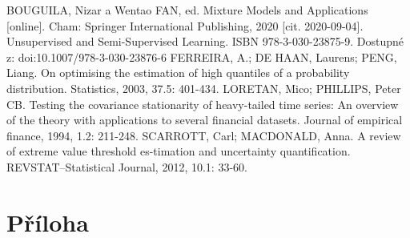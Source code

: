\documentclass[11pt,twoside,openright]{report}
\begin{document}
\begin{thebibliography}{L}
BOUGUILA, Nizar a Wentao FAN, ed. Mixture Models and Applications [online]. Cham: Springer International Publishing, 2020 [cit. 2020-09-04]. Unsupervised and Semi-Supervised Learning. ISBN 978-3-030-23875-9. Dostupné z: doi:10.1007/978-3-030-23876-6
FERREIRA, A.; DE HAAN, Laurens; PENG, Liang. On optimising the estimation of high quantiles of a probability distribution. Statistics, 2003, 37.5: 401-434.
LORETAN, Mico; PHILLIPS, Peter CB. Testing the covariance stationarity of heavy-tailed time series: An overview of the theory with applications to several financial datasets. Journal of empirical finance, 1994, 1.2: 211-248.
SCARROTT, Carl; MACDONALD, Anna. A review of extreme value threshold es-timation and uncertainty quantification. REVSTAT–Statistical Journal, 2012, 10.1: 33-60.

\end{thebibliography}



\clearpage
\chapter*{Příloha}
\begin{appendices}

\end{appendices}
\end{document}

